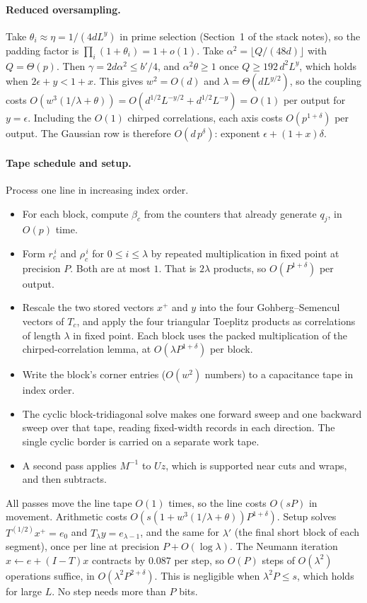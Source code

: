 \documentclass[11pt]{article}
\theoremstyle{remark}\newtheorem*{remark}{Remark}
\begin{document}
\paragraph{Reduced oversampling.} Take $\theta_i\approx\eta=1/(4dL^y)$ in prime selection
(Section~1 of the stack notes), so the padding factor is $\prod_i(1+\theta_i)=1+o(1)$.
Take $\alpha^2=\lfloor Q/(48d)\rfloor$ with $Q=\Theta(p)$. Then $\gamma=2d\alpha^2\le b'/4$, and
$\alpha^2\theta\ge1$ once $Q\ge192\,d^2L^y$, which holds when $2\epsilon+y<1+x$. This gives
$w^2=O(d)$ and $\lambda=\Theta(dL^{y/2})$, so the coupling costs
$O(w^3(1/\lambda+\theta))=O(d^{1/2}L^{-y/2}+d^{1/2}L^{-y})=O(1)$ per output for $y=\epsilon$.
Including the $O(1)$ chirped correlations, each axis costs $O(p^{1+\delta})$ per output. The
Gaussian row is therefore $O(d\,p^\delta)$: exponent $\epsilon+(1+x)\delta$.


\paragraph{Tape schedule and setup.} Process one line in increasing index order.
\begin{itemize}
\item For each block, compute $\beta_c$ from the counters that already generate $q_j$, in $O(p)$
time.
\item Form $r_c^{\,i}$ and $\rho_c^{\,i}$ for $0\le i\le\lambda$ by repeated multiplication in
fixed point at precision $P$. Both are at most $1$. That is $2\lambda$ products, so
$O(P^{1+\delta})$ per output.
\item Rescale the two stored vectors $x^+$ and $y$ into the four Gohberg--Semencul vectors of
$T_c$, and apply the four triangular Toeplitz products as correlations of length $\lambda$ in
fixed point. Each block uses the packed multiplication of the chirped-correlation lemma, at
$O(\lambda P^{1+\delta})$ per block.
\item Write the block's corner entries ($O(w^2)$ numbers) to a capacitance tape in index order.
\item The cyclic block-tridiagonal solve makes one forward sweep and one backward sweep over
that tape, reading fixed-width records in each direction. The single cyclic border is carried
on a separate work tape.
\item A second pass applies $M^{-1}$ to $Uz$, which is supported near cuts and wraps, and then
subtracts.
\end{itemize}
All passes move the line tape $O(1)$ times, so the line costs $O(sP)$ in movement. Arithmetic
costs $O(s(1+w^3(1/\lambda+\theta))P^{1+\delta})$. Setup solves $T^{(1/2)}x^+=e_0$ and
$T_\lambda y=e_{\lambda-1}$, and the same for $\lambda'$ (the final short block of each segment),
once per line at precision $P+O(\log\lambda)$. The Neumann iteration $x\leftarrow e+(I-T)x$
contracts by $0.087$ per step, so $O(P)$ steps of $O(\lambda^2)$ operations suffice, in
$O(\lambda^2P^{2+\delta})$. This is negligible when $\lambda^2P\le s$, which holds for large $L$.
No step needs more than $P$ bits.
\end{document}

